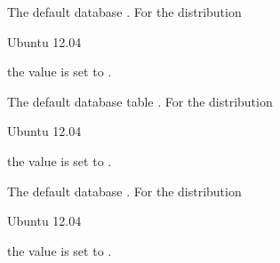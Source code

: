 The default database .
For the distribution
\begin{inparaitem}
\item[\TheDistribution{ubuntu}] Ubuntu 12.04
\end{inparaitem}
the value is set to .


The default database table .
For the distribution
\begin{inparaitem}
\item[\TheDistribution{ubuntu}] Ubuntu 12.04
\end{inparaitem}
the value is set to .


The default database .
For the distribution
\begin{inparaitem}
\item[\TheDistribution{ubuntu}] Ubuntu 12.04
\end{inparaitem}
the value is set to .

